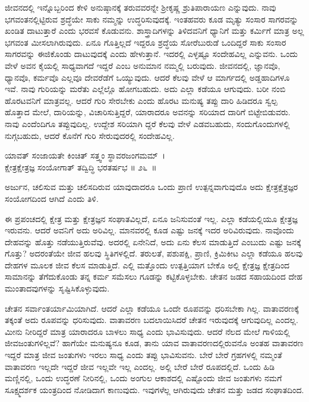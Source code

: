 ಜೀವನದಲ್ಲಿ ಇನ್ನೊಬ್ಬರಿಂದ ಕೇಳಿ ಅನುಷ್ಠಾನಕ್ಕೆ ತರುವವರನ್ನೇ ಶ‍್ರೀಕೃಷ್ಣ ಶ್ರುತಿಪಾರಾಯಣ ಎನ್ನುವುದು. ನಾವು ಭಗವಂತನಲ್ಲಿಟ್ಟಿರುವ ಶ್ರದ್ಧೆಯೇ ಸಾಕು ನಮ್ಮನ್ನು ಉದ್ಧರಿಸುವುದಕ್ಕೆ. ಇಂತಹವರು ಕೂಡ ಮೃತ್ಯು ಸಂಸಾರ ಸಾಗರವನ್ನು ಖಂಡಿತ ದಾಟುತ್ತಾರೆ ಎಂದು ಭರವಸೆ ಕೊಡುವನು. ಶಾಸ್ತ್ರಾದಿಗಳನ್ನು ತಿಳಿದವನಿಗೆ ಧ್ಯಾನಿಗೆ ಮತ್ತು ಕರ್ಮಿಗೆ ಮಾತ್ರ ಅಲ್ಲ ಭಗವಂತ ಮೀಸಲಾಗಿರುವುದು. ಏನೂ ಗೊತ್ತಿಲ್ಲದೆ ಇದ್ದರೂ ಶ್ರದ್ಧೆಯ ಸೋರೆಬುರುಡೆ ಒಂದಿದ್ದರೆ ಸಾಕು ಸಂಸಾರ ಸಾಗರವನ್ನು ಈಜಿಕೊಂಡು ದಾಟುವುದಕ್ಕೆ ಎಂದು ಹೇಳುತ್ತಾನೆ. ಇದರಲ್ಲಿ ಎಳ್ಳಷ್ಟೂ ಸಂದೇಹವಿಲ್ಲ ಎನ್ನುವನು. ಒಂದು ವೇಳೆ ಅವನ ಕೈಯಲ್ಲಿ ಸಾಧ್ಯವಾಗದೆ ಇದ್ದರೆ ಎಂಬ ಅನುಮಾನ ನಮ್ಮಲ್ಲಿ ಬರುವುದು. ಜೀವನದಲ್ಲಿ, ಜ್ಞಾನವೊ, ಧ್ಯಾನವೊ, ಕರ್ಮವೊ ಎಲ್ಲವೂ ದೇವರೆಡೆಗೆ ಒಯ್ಯುವುದು. ಆದರೆ ಕೆಲವು ವೇಳೆ ಆ ಮಾರ್ಗದಲ್ಲಿ ಅಡ್ಡಹಾದಿಗಳೂ ಇವೆ. ನಾವು ಗುರಿಯನ್ನು ಮರೆತು ಎಲ್ಲೆಲ್ಲೊ ಹೋಗಬಹುದು. ಅದು ಎಲ್ಲಾ ಕಡೆಯೂ ಆಗುವುದು. ಬರೀ ನಂಬಿ ಹೊರಟವನಿಗೆ ಮಾತ್ರವಲ್ಲ. ಆದರೆ ಗುರಿ ಸೇರಬೇಕು ಎಂದು ಹೊರಟ ಮನುಷ್ಯ ತಪ್ಪು ದಾರಿ ಹಿಡಿದರೂ ಸ್ವಲ್ಪ ಹೊತ್ತಾದ ಮೇಲೆ, ದಾರಿಯನ್ನು, ವಿಚಾರಿಸುತ್ತಿದ್ದರೆ, ಯಾರಾದರೂ ಅವನನ್ನು ಸರಿಯಾದ ದಾರಿಗೆ ಬಿಟ್ಟೇಬಿಡುವರು. ನಾವು ಎಂದೆಂದಿಗೂ ತಪ್ಪುವುದಿಲ್ಲ. ಉದ್ದೇಶ ಸರಿಯಾಗಿ ದ್ದರೆ ಕೆಲವು ವೇಳೆ ಎಡವಬಹುದು, ಸಂದುಗೊಂದುಗಳಲ್ಲಿ ನುಗ್ಗಬಹುದು, ಆದರೆ ಕೊನೆಗೆ ಗುರಿ ಸೇರುವುದರಲ್ಲಿ ಸಂದೇಹವಿಲ್ಲ.

\begin{shloka}
ಯಾವತ್ ಸಂಜಾಯತೇ ಕಿಂಚಿತ್ ಸತ್ತ್ವಂ ಸ್ಥಾವರಜಂಗಮಮ್~।\\ಕ್ಷೇತ್ರಕ್ಷೇತ್ರಜ್ಞ ಸಂಯೋಗಾತ್ ತದ್ವಿದ್ಧಿ ಭರತರ್ಷಭ \hfill॥ ೨೬~॥
\end{shloka}

\begin{artha}
ಅರ್ಜುನ, ಚಲಿಸುವ ಮತ್ತು ಚಲಿಸದಿರುವ ಯಾವುದಾದರೂ ಒಂದು ಪ್ರಾಣಿ ಉತ್ಪನ್ನವಾಗುವುದೊ ಅದು ಕ್ಷೇತ್ರಕ್ಷೆತ್ರಜ್ಞರ ಸಂಯೋಗದಿಂದ ಆಗಿದೆ ಎಂದು ತಿಳಿ.
\end{artha}

ಈ ಪ್ರಪಂಚದಲ್ಲಿ ಕ್ಷೇತ್ರ ಮತ್ತು ಕ್ಷೇತ್ರಜ್ಞನ ಸಂಘಾತವಿಲ್ಲದೆ, ಏನೂ ಜನಿಸುವಂತೆ ಇಲ್ಲ. ಎಲ್ಲಾ ಕಡೆಯಲ್ಲಿಯೂ ಕ್ಷೇತ್ರಜ್ಞ ಇರುವನು. ಆದರೆ ಅವನಿಗೆ ಅದು ಅರಿವಿಲ್ಲ. ಮಾನವರಲ್ಲಿ ಕೂಡ ಎಷ್ಟು ಜನಕ್ಕೆ ಇದರ ಅರಿವಿರುವುದು. ನಾವೊಂದು ದೇಹವನ್ನು ಹೊತ್ತು ನಡೆಯುತ್ತಿರುವೆವು. ಅದರಲ್ಲಿ ಏನೇನಿದೆ, ಅದು ಏನು ಕೆಲಸ ಮಾಡುತ್ತಿದೆ ಎಂಬುದು ಎಷ್ಟು ಜನಕ್ಕೆ ಗೊತ್ತು? ಅದರಂತೆಯೇ ಜೀವ ಹಲವು ಸ್ಥಿತಿಗಳಲ್ಲಿದೆ. ತರುಲತೆ, ಪಶುಪಕ್ಷಿ, ಪ್ರಾಣಿ, ಕ್ರಿಮಿಕೀಟ ಎಲ್ಲಾ ಕಡೆಯೂ ಹಲವು ದೇಹಗಳ ಮೂಲಕ ಜೀವ ಕೆಲಸ ಮಾಡುತ್ತಿದೆ. ಎಲ್ಲಿ ಮತ್ತೊಂದು ಉತ್ಪತ್ತಿಯಾಗ ಬೇಕೊ ಅಲ್ಲಿ ಕ್ಷೇತ್ರಜ್ಞ ಕ್ಷೇತ್ರದಿಂದ ಸಾಮಾನನ್ನು ತೆಗೆದುಕೊಂಡು ತನ್ನ ಕರ್ಮ ಸಮೆಸಲು ಗೂಡನ್ನು ಕಟ್ಟಿಕೊಳ್ಳಬೇಕು. ಚೇತನ ಜಡದ ಸಹಾಯದಿಂದ ದೇಹ ಮುಂತಾದವುಗಳನ್ನು ಸೃಷ್ಟಿಸಿಕೊಳ್ಳುವುದು.

ಚೇತನ ಸರ್ವಾಂತರ್ಯಾಮಿಯಾಗಿದೆ. ಆದರೆ ಎಲ್ಲಾ ಕಡೆಯೂ ಒಂದೇ ರೂಪವನ್ನು ಧರಿಸಬೇಕಾ ಗಿಲ್ಲ. ವಾತಾವರಣಕ್ಕೆ ತಕ್ಕಂತೆ ಅದು ರೂಪವನ್ನು ಧರಿಸುವುದು. ವಾತಾವರಣ ಬದಲಾಯಿಸಿದರೆ ಚೇತನ ಇರುವುದಕ್ಕೆ ಆಗುವುದಿಲ್ಲ ಎಂದಲ್ಲ. ಮೀನು ನೀರಿದ್ದರೆ ಮಾತ್ರ ಯಾರಾದರೂ ಬಾಳಲು ಸಾಧ್ಯ ಎಂದು ಭಾವಿಸುವುದು. ಆದರೆ ನೆಲದ ಮೇಲೆ ಗಾಳಿಯಲ್ಲಿ ಜೀವಜಂತುಗಳಿಲ್ಲವೆ? ಹಾಗೆಯೇ ಮನುಷ್ಯನೂ ಕೂಡ, ತಾನು ಯಾವ ವಾತಾವರಣದಲ್ಲಿರು\-ವನೊ ಅಂತಹ ವಾತಾವರಣ ಇದ್ದರೆ ಮಾತ್ರ ಜೀವ ಜಂತುಗಳು ಇರಲು ಸಾಧ್ಯ ಎಂದು ತಪ್ಪು ಭಾವಿಸುವನು. ಬೇರೆ ಬೇರೆ ಗ್ರಹಗಳಲ್ಲಿ ನಮ್ಮಂತೆ ವಾತಾವರಣ ಇಲ್ಲದೇ ಇದ್ದರೆ ಜೀವ ಇಲ್ಲವೇ ಇಲ್ಲ ಎಂದಲ್ಲ. ಅಲ್ಲಿ ಬೇರೆ ಬೇರೆ ರೂಪದಲ್ಲಿದೆ. ಒಂದು ಹಿಡಿ ಮಣ್ಣಿನಲ್ಲಿ, ಒಂದು ಉದ್ಧರಣೆ ನೀರಿನಲ್ಲಿ, ಒಂದು ಅಂಗುಲ ಆಕಾಶದಲ್ಲಿ ಎಷ್ಟೊಂದು ಜೀವ ಜಂತುಗಳು ನಮಗೆ ಸೂಕ್ಷ್ಮದರ್ಶಕ ಯಂತ್ರದಿಂದ ನೋಡಿದಾಗ ಕಾಣುವುದು. ಇವುಗಳೆಲ್ಲ ಆಗಿರುವುದು ಚೇತನ ಮತ್ತು ಜಡದ ಸಂಘಾತದಿಂದ.

